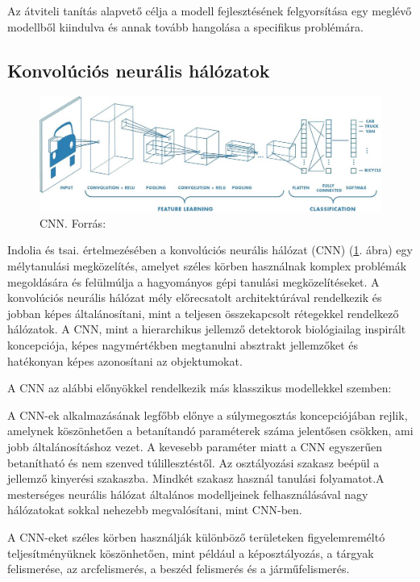 \documentclass[12pt,a4]{article}
\begin{document}
     Az átviteli tanítás alapvető célja a modell fejlesztésének felgyorsítása egy meglévő modellből kiindulva és annak tovább hangolása a specifikus problémára.
 
	\subsection{Konvolúciós neurális hálózatok}
	\begin{figure}[h]	
		\centering
		\includegraphics[width=1\linewidth]{CNN}
		\caption{CNN. Forrás: \cite{CNN}}
        \label{fig:cnn}
	\end{figure}
 
	Indolia és tsai. \cite{CNN} értelmezésében a konvolúciós neurális hálózat (CNN) (\ref{fig:cnn}. ábra) egy
	mélytanulási megközelítés, amelyet széles körben használnak komplex problémák megoldására és felülmúlja a hagyományos gépi tanulási megközelítéseket. A konvolúciós neurális hálózat mély előrecsatolt architektúrával rendelkezik és jobban képes általánosítani, mint a teljesen összekapcsolt rétegekkel rendelkező hálózatok.
	A CNN, mint a hierarchikus jellemző detektorok biológiailag inspirált koncepciója, képes nagymértékben megtanulni
	absztrakt jellemzőket és hatékonyan képes azonosítani az objektumokat.
	
	A CNN az alábbi előnyökkel rendelkezik más klasszikus modellekkel szemben:
	
	  A CNN-ek alkalmazásának legfőbb előnye a súlymegosztás koncepciójában rejlik, amelynek köszönhetően a 
    betanítandó paraméterek száma jelentősen csökken, ami jobb általánosításhoz vezet. 
	A kevesebb paraméter miatt a CNN egyszerűen betanítható és nem szenved túlillesztéstől. Az osztályozási szakasz beépül a jellemző kinyerési szakaszba. Mindkét szakasz használ tanulási folyamatot.A mesterséges neurális hálózat általános modelljeinek felhasználásával nagy hálózatokat sokkal nehezebb megvalósítani,
	mint CNN-ben.
	
	A CNN-eket széles körben használják különböző területeken figyelemreméltó
	teljesítményüknek köszönhetően, mint például a képosztályozás, a tárgyak felismerése, az arcfelismerés, a beszéd
	felismerés és a járműfelismerés.
	
\end{document}
